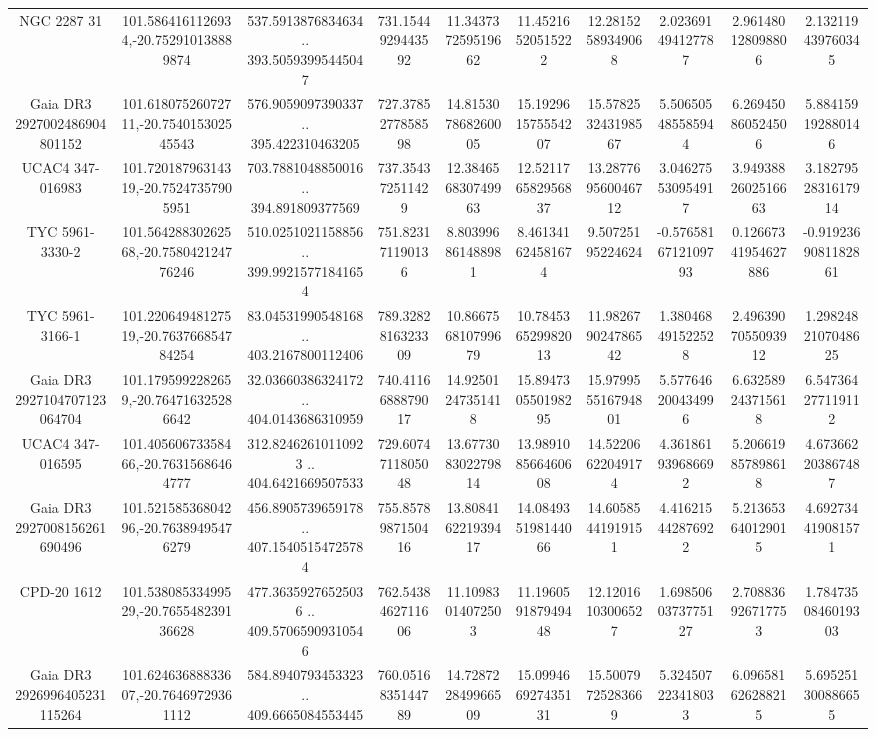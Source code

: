 \begin{table}
\begin{tabular}{cccccccccc}
NGC  2287    31 & 101.5864161126934,-20.752910138889874 & 537.5913876834634 .. 393.50593995445047 & 731.1544929443592 & 11.343737259519662 & 11.45216520515222 & 12.28152589349068 & 2.023691494127787 & 2.961480128098806 & 2.132119439760345 \\
Gaia DR3 2927002486904801152 & 101.61807526072711,-20.754015302545543 & 576.9059097390337 .. 395.422310463205 & 727.3785277858598 & 14.815307868260005 & 15.192961575554207 & 15.578253243198567 & 5.506505485585944 & 6.269450860524506 & 5.884159192880146 \\
UCAC4 347-016983 & 101.72018796314319,-20.75247357905951 & 703.7881048850016 .. 394.891809377569 & 737.354372511429 & 12.384656830749963 & 12.521176582956837 & 13.287769560046712 & 3.046275530954917 & 3.9493882602516663 & 3.1827952831617914 \\
TYC 5961-3330-2 & 101.56428830262568,-20.758042124776246 & 510.0251021158856 .. 399.99215771841654 & 751.823171190136 & 8.803996861488981 & 8.461341624581674 & 9.50725195224624 & -0.5765816712109793 & 0.12667341954627886 & -0.9192369081182861 \\
TYC 5961-3166-1 & 101.22064948127519,-20.763766854784254 & 83.04531990548168 .. 403.2167800112406 & 789.3282816323309 & 10.866756810799679 & 10.784536529982013 & 11.982679024786542 & 1.380468491522528 & 2.4963907055093912 & 1.2982482107048625 \\
Gaia DR3 2927104707123064704 & 101.1795992282659,-20.764716325286642 & 32.03660386324172 .. 404.0143686310959 & 740.4116688879017 & 14.92501247351418 & 15.894730550198295 & 15.979955516794801 & 5.577646200434996 & 6.632589243715618 & 6.547364277119112 \\
UCAC4 347-016595 & 101.40560673358466,-20.76315686464777 & 312.82462610110923 .. 404.6421669507533 & 729.6074711805048 & 13.677308302279814 & 13.989108566460608 & 14.52206622049174 & 4.361861939686692 & 5.206619857898618 & 4.673662203867487 \\
Gaia DR3 2927008156261690496 & 101.52158536804296,-20.76389495476279 & 456.8905739659178 .. 407.15405154725784 & 755.8578987150416 & 13.808416221939417 & 14.084935198144066 & 14.60585441919151 & 4.416215442876922 & 5.213653640129015 & 4.692734419081571 \\
CPD-20  1612 & 101.53808533499529,-20.765548239136628 & 477.36359276525036 .. 409.57065909310546 & 762.5438462711606 & 11.10983014072503 & 11.196059187949448 & 12.12016103006527 & 1.6985060373775127 & 2.708836926717753 & 1.7847350846019303 \\
Gaia DR3 2926996405231115264 & 101.62463688833607,-20.76469729361112 & 584.8940793453323 .. 409.6665084553445 & 760.0516835144789 & 14.728722849966509 & 15.099466927435131 & 15.50079725283669 & 5.324507223418033 & 6.096581626288215 & 5.695251300886655 \\

\end{tabular}
\end{table}

